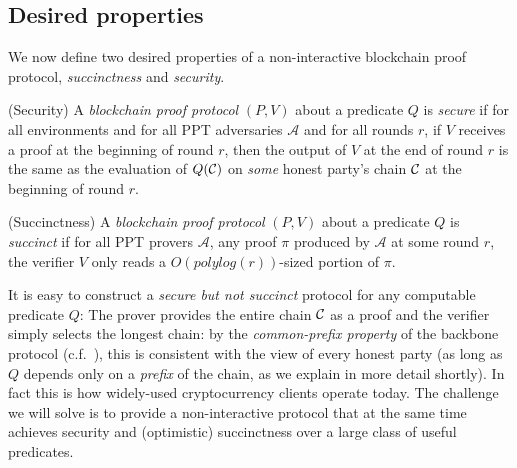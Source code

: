 \subsection{Desired properties}

We now define two desired properties of a non-interactive blockchain proof
protocol, \emph{succinctness} and \emph{security}.

\begin{definition}{(Security)}
A \emph{blockchain proof protocol} $(P, V)$ about a predicate $Q$ is
\emph{secure} if for all environments and for all PPT adversaries
$\mathcal{A}$ and for all rounds $r$, if $V$ receives a proof at the beginning
of round $r$, then the output of $V$ at the end of round $r$ is the same as the
evaluation of $Q(\mathcal{C})$ on \emph{some} honest party's chain $\mathcal{C}$ at the
beginning of round $r$.
\end{definition}

\begin{definition}{(Succinctness)}
A \emph{blockchain proof protocol} $(P, V)$ about a predicate $Q$ is
\emph{succinct} if for all PPT provers $\mathcal{A}$, any proof $\pi$ produced
by $\mathcal{A}$ at some round $r$, the verifier $V$ only reads a
$O(polylog(r))$-sized portion of $\pi$.
\end{definition}

It is easy to construct a \emph{secure but not succinct} protocol for any
computable predicate $Q$: The prover provides the entire chain $\mathcal{C}$ as a proof and the
verifier simply selects the longest chain:
by the \emph{common-prefix property} of the backbone protocol (c.f.~\cite{backbone}), this is consistent with
the view of every honest party (as long as $Q$ depends only on a \emph{prefix} of the chain, as we explain in more detail shortly). In fact this is how widely-used cryptocurrency clients operate today.
The challenge we will solve is to provide a non-interactive protocol that at the
same time achieves security and (optimistic) succinctness over a large class of
useful predicates.
